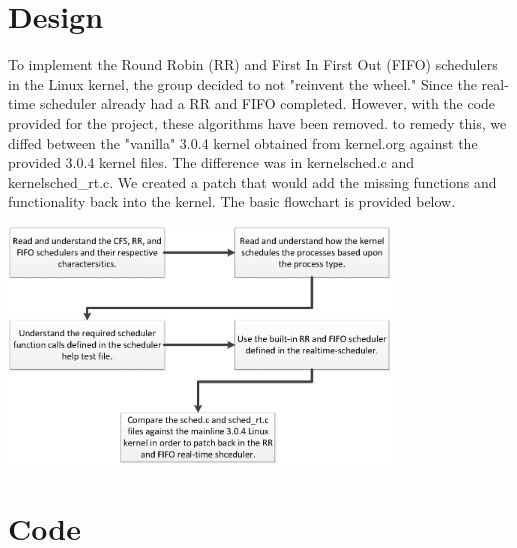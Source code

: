 \documentclass[letterpaper,10pt,titlepage]{article}
\begin{document}
%
%

\section{Design}
\label{Design Process & Implementation}
To implement the Round Robin (RR) and First In First Out (FIFO) schedulers in the Linux kernel, the group decided to not "reinvent the wheel." Since the real-time scheduler already had a RR and FIFO completed. However, with the code provided for the project, these algorithms have been removed. to remedy this, we diffed between the "vanilla" 3.0.4 kernel obtained from kernel.org against the provided 3.0.4 kernel files. The difference was in kernel\/sched.c and kernel\/sched\_rt.c. We created a patch that would add the missing functions and functionality back into the kernel. The basic flowchart is provided below.

\begin{center}
\includegraphics[width=4in]{design.eps}
\end{center}

\section{Code}
\label{Implementation Specific Code}

\end{document}

